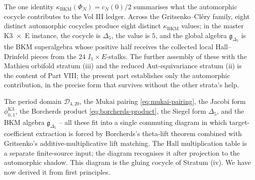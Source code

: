 The one identity $\kappa_{\mathrm{BKM}}(\Phi_N) = c_N(0) / 2$ summarises what the automorphic cocycle contributes to the Vol III ledger. Across the Gritsenko--Cl\'ery family, eight distinct automorphic cocycles produce eight distinct $\kappa_{\mathrm{BKM}}$ values; in the master K3~$\times$~E instance, the cocycle is $\Delta_5$, the value is $5$, and the global algebra $\mathfrak g_{\Delta_5}$ is the BKM superalgebra whose positive half receives the collected local Hall--Drinfeld pieces from the $24$ $I_1 \times E$-stalks. The further assembly of these with the Mathieu orbifold stratum (iii) and the reduced Aut-equivariance stratum (ii) is the content of Part VIII; the present part establishes only the automorphic contribution, in the precise form that survives without the other strata's help.

The period domain $\mathcal D_{4, 20}$, the Mukai pairing \eqref{eq:mukai-pairing}, the Jacobi form $\phi_{0, 1}^{\mathrm{K3}}$, the Borcherds product \eqref{eq:borcherds-product}, the Siegel form $\Delta_5$, and the BKM algebra $\mathfrak g_{\Delta_5}$ -- all these fit into a single commuting diagram in which target-coefficient extraction is forced by Borcherds's theta-lift theorem combined with Gritsenko's additive-multiplicative lift matching. The Hall multiplication table is a separate finite-source input; the diagram recognises it after projection to the automorphic shadow. This diagram is the gluing cocycle of Stratum (iv). We have now derived it from first principles.
